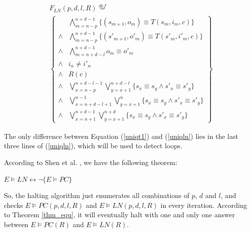 \documentclass[journal]{IEEEtran}
\begin{document}
\begin{equation}\label{uniqln}
\begin{split}
&F_{LN}(p,d,l,R)\stackrel{def}{=}\\
&\left\{
\begin{array}{cc}
&\bigwedge_{m=n-p}^{n+d-1}
\{
(s_{m+1},o_m)\equiv T(s_m,i_m,c)
\}
\\
\wedge&\bigwedge_{m=n-p}^{n+d-1}
\{
(s'_{m+1},o'_m)\equiv T(s'_m,i'_m,c)
\}
\\
\wedge&\bigwedge_{m=n+d-l}^{n+d-1}o_m\equiv o'_m \\
\wedge& i_n\ne i'_n \\
\wedge& R(c) \\
\wedge& \bigvee_{x=n-p}^{n+d-l-1}\bigvee_{y=x+1}^{n+d-l} \{s_x\equiv s_y\wedge s'_x\equiv s'_y\} \\
\wedge& \bigvee_{x=n+d-l+1}^{n-1}\bigvee_{y=x+1}^{n} \{s_x\equiv s_y\wedge s'_x\equiv s'_y\} \\
\wedge& \bigvee_{x=n+1}^{n+d-1}\bigvee_{y=x+1}^{n+d} \{s_x\equiv s_y\wedge s'_x\equiv s'_y\}
\end{array}
\right\}
\end{split}
\end{equation}

The only difference between Equation (\ref{uniqt1}) and (\ref{uniqln}) lies in the last three lines of (\ref{uniqln}),
which will be used to detect loops.

According to Shen et al. \cite{ShengYuShen:tcad11},
we have the following theorem:


\begin{theorem}[]\label{thm_equ}
$E\vDash LN\leftrightarrow \neg \{E\vDash PC\}$
\end{theorem}

So,
the halting algorithm \cite{ShengYuShen:tcad11} just enumerates all combinations of $p$, $d$ and $l$,
and checks $E\vDash PC(p,d,l,R)$ and $E\vDash LN(p,d,l,R)$ in every iteration.
According to Theorem \ref{thm_equ},
it will eventually halt with one and only one answer between $E\vDash PC(R)$ and $E\vDash LN(R)$.

\end{document}
